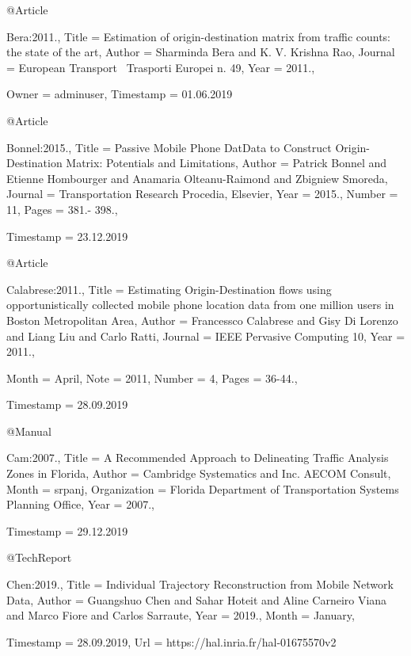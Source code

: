@Article{Bera:2011.,
  Title                    = {{Estimation of origin-destination matrix from traffic counts: the state of the art}},
  Author                   = {Sharminda Bera and K. V. Krishna Rao},
  Journal                  = {European Transport \ Trasporti Europei n. 49},
  Year                     = {2011.},

  Owner                    = {adminuser},
  Timestamp                = {01.06.2019}
}

@Article{Bonnel:2015.,
  Title                    = {{Passive Mobile Phone DatData to Construct Origin-Destination Matrix: Potentials and Limitations}},
  Author                   = {Patrick Bonnel and Etienne Hombourger and Anamaria Olteanu-Raimond and Zbigniew Smoreda},
  Journal                  = {{Transportation Research Procedia, Elsevier}},
  Year                     = {2015.},
  Number                   = {11},
  Pages                    = {381.- 398.},

  Timestamp                = {23.12.2019}
}

@Article{Calabrese:2011.,
  Title                    = {Estimating {Origin-Destination} flows using opportunistically collected mobile phone location data from one million users in {Boston Metropolitan Area}},
  Author                   = {Francessco Calabrese and Gisy Di Lorenzo and Liang Liu and Carlo Ratti},
  Journal                  = {IEEE Pervasive Computing 10},
  Year                     = {2011.},

  Month                    = {April},
  Note                     = {2011},
  Number                   = {4},
  Pages                    = {36-44.},

  Timestamp                = {28.09.2019}
}

@Manual{Cam:2007.,
  Title                    = {{A Recommended Approach to Delineating Traffic Analysis Zones in Florida}},
  Author                   = {{Cambridge Systematics and Inc. AECOM Consult}},
  Month                    = {srpanj},
  Organization             = {Florida Department of Transportation Systems Planning Office},
  Year                     = {2007.},

  Timestamp                = {29.12.2019}
}

@TechReport{Chen:2019.,
  Title                    = {{Individual Trajectory Reconstruction from Mobile Network Data}},
  Author                   = {Guangshuo Chen and Sahar Hoteit and Aline Carneiro Viana and Marco Fiore and Carlos Sarraute},
  Year                     = {2019.},
  Month                    = {January},

  Timestamp                = {28.09.2019},
  Url                      = {https://hal.inria.fr/hal-01675570v2}
}

